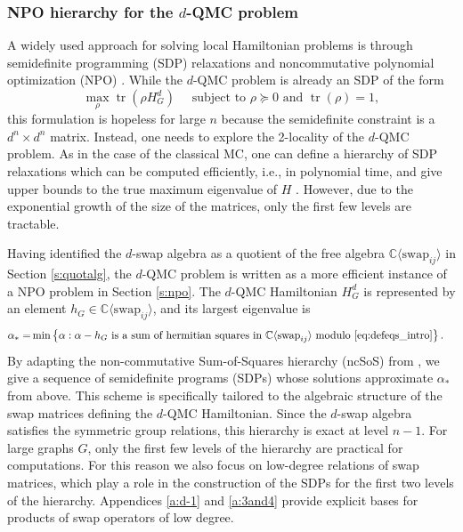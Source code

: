 \documentclass[12pt,dvipsnames,accepted=2016-08-18,a4paper,onecolumn]{quantumarticle}
\DeclareMathOperator{\Tr}{tr}
\numberwithin{equation}{section}
\newcommand{\CC}{\mathbb C}
\theoremstyle{definition}
\begin{document}
\subsubsection{NPO hierarchy for the $d$-QMC problem}
A widely used approach for solving local Hamiltonian problems is through semidefinite programming (SDP) relaxations and noncommutative polynomial optimization (NPO) \cite{NPA08,NPA,DLTW,BKP16}.
While the $d$-QMC problem is already an SDP of the form
$$
\max_\rho \Tr (\rho H_G^d)\quad\text{ subject to }
\rho \succeq 0\text{ and }\Tr(\rho)=1,
$$
this formulation is hopeless for large $n$ because the semidefinite constraint is a $d^n\times d^n$ matrix.
Instead, one needs to explore the 2-locality of the $d$-QMC problem. As in the case of the classical MC, one can define a hierarchy of SDP relaxations which can be computed efficiently, i.e., in polynomial time, and give upper bounds to the true maximum eigenvalue of $H$
\cite{BH13, BGKT19, GP19, PT21, HO22}.
However, due to the exponential growth of the size of the matrices, only the first few levels are tractable. 

Having identified the $d$-swap algebra as a quotient of the free algebra $\CC\langle\text{swap}_{ij}\rangle$ in Section \ref{s:quotalg}, the $d$-QMC problem is written as a more efficient instance of a NPO problem in Section \ref{s:npo}. 
The $d$-QMC Hamiltonian $H^d_G$ is represented by an element $h_G\in \CC\langle\text{swap}_{ij}\rangle$, and 
its largest eigenvalue is
\begin{align*}
\alpha_*=&\min\left\{
\alpha:\alpha-h_G\text{ is a sum of hermitian squares in } \CC\langle\text{swap}_{ij}\rangle \text{ modulo \eqref{eq:defeqs_intro}}
\right\} .
\end{align*}
By adapting the non-commutative Sum-of-Squares hierarchy (ncSoS) from \cite{BCEHK24}, we give a sequence of semidefinite programs (SDPs) whose solutions approximate $\alpha_*$ from above. This scheme is specifically tailored to the algebraic structure of the swap matrices defining the $d$-QMC Hamiltonian. 
Since the $d$-swap algebra satisfies the symmetric group relations,
this hierarchy is exact at level $n-1.$
For large graphs $G$, only the first few levels of the hierarchy are practical for computations. For this reason we also focus on low-degree relations of swap matrices, which play a role in the construction of the SDPs for the first two levels of the hierarchy. Appendices \ref{a:d-1} and \ref{a:3and4} provide explicit bases for products of swap operators of low degree.
\end{document}
